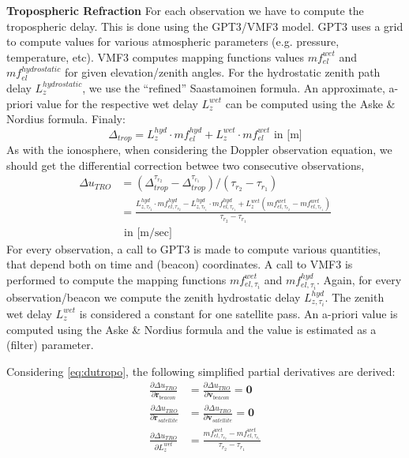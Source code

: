 \textbf{Tropospheric Refraction}
\label{tropospheric-refraction}
For each observation we have to compute the tropospheric delay. This is done using 
the GPT3/VMF3 model. GPT3 uses a grid to compute values for various atmospheric 
parameters (e.g. pressure, temperature, etc). VMF3 computes mapping functions values 
$mf_{el}^{wet}$ and $mf_{el}^{hydrostatic}$ for given elevation/zenith angles.
For the hydrostatic zenith path delay $L_{z}^{hydrostatic}$, we use the 
``refined'' Saastamoinen formula. An approximate, a-priori value for the 
respective wet delay $L_{z}^{wet}$ can be computed using the Aske \& Nordius 
formula. Finaly:
\begin{equation}
  \Delta _{trop} = L_{z}^{hyd} \cdot mf_{el}^{hyd} 
                 + L_{z}^{wet} \cdot mf_{el}^{wet} \text{ in [m]}
\end{equation}
As with the ionosphere, when considering the Doppler observation equation, we should 
get the differential correction betwee two consecutive observations,
\begin{equation}
  \begin{split}
  \label{eq:dutropo}
  \Delta u_{TRO} & = \left( \Delta _{trop}^{\tau_{r_2}} 
                  - \Delta _{trop}^{\tau_{r_1}} \right)
                    / (\tau_{r_2} - \tau_{r_1}) \\
                 & = \frac{L_{z,\tau_{r_2}}^{hyd} \cdot mf_{el,\tau_{r_2}}^{hyd} 
                   - L_{z,\tau_{r_1}}^{hyd} \cdot mf_{el,\tau_{r_1}}^{hyd} 
                   + L_{z}^{wet} \left( mf_{el,\tau_{r_2}}^{wet} - mf_{el,\tau_{r_1}}^{wet} \right)}
                   {\tau_{r_2} - \tau_{r_1}} \\
                 & \text{ in [m/sec]}
  \end{split}
\end{equation}
For every observation, a call to GPT3 is made to compute various quantities, 
that depend both on time and (beacon) coordinates. A call to VMF3 is performed 
to compute the mapping functions $mf_{el,\tau_i}^{wet}$ and $mf_{el,\tau_i}^{hyd}$.
Again, for every observation/beacon we compute the zenith hydrostatic delay 
$L_{z,\tau_i}^{hyd}$. The zenith wet delay $L_{z}^{wet}$ is considered a constant 
for one satellite pass. An a-priori value is computed using the Aske \& Nordius formula 
and the value is estimated as a (filter) parameter.

Considering \ref{eq:dutropo}, the following {\color{lime} simplified} partial 
derivatives are derived:
\begin{align}
  \frac{\partial \Delta u_{TRO}}{\partial \bm{r}_{beacon}}    
    &= \frac{\partial \Delta u_{TRO}}{\partial \bm{v}_{beacon}} = \bm{0} \\
  \frac{\partial \Delta u_{TRO}}{\partial \bm{r}_{satellite}} 
    &= \frac{\partial \Delta u_{TRO}}{\partial \bm{v}_{satellite}} = \bm{0} \\
  \frac{\partial \Delta u_{TRO}}{\partial L_{z}^{wet}} 
    &= \frac{mf_{el,\tau_{r_2}}^{wet} - mf_{el,\tau_{r_1}}^{wet}}{\tau_{r_2} - \tau_{r_1}}
\end{align}

